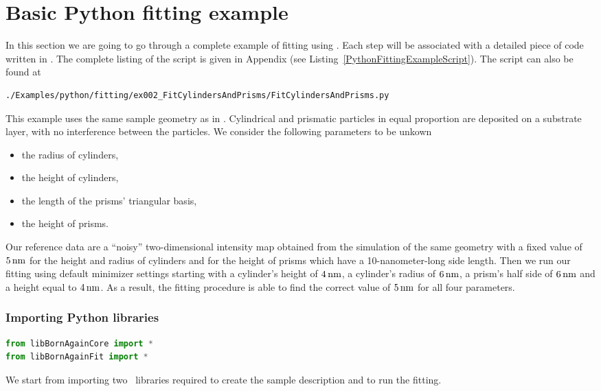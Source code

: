 \section{Basic Python fitting example} 

In this section we are going to go through a complete example of
fitting using \BornAgain. Each  step will be associated with a
detailed piece of code written in \Python. 
The complete listing of
the script is given in Appendix (see Listing~\ref{PythonFittingExampleScript}).
The script can also be found at
\begin{lstlisting}[language=shell, style=commandline]
./Examples/python/fitting/ex002_FitCylindersAndPrisms/FitCylindersAndPrisms.py
\end{lstlisting}

\noindent
This example uses the same sample geometry as in .
Cylindrical and
prismatic particles in equal proportion are deposited on a substrate layer, with no interference
between the particles. We consider the following parameters to be unkown
\begin{itemize}
\item the radius of cylinders,
\item the height of cylinders,
\item the length of the prisms' triangular basis,
\item the height of prisms.
\end{itemize}

Our reference data are a ``noisy'' two-dimensional intensity
map obtained from the simulation of the same geometry with a fixed
value of $5\,{\rm nm}$ for the height and radius of cylinders and for the
height of prisms which have a 10-nanometer-long side length. 
Then we run our fitting using default minimizer settings
starting with a cylinder's height
of $4\,{\rm nm}$, a cylinder's radius of $6\,{\rm nm}$, 
a prism's half side of $6\,{\rm nm}$ and a height equal to $4\,{\rm nm}$.
As a result, the fitting procedure is able to find the correct value of $5\,{\rm nm}$
for all four parameters.


\subsubsection*{Importing Python libraries}
\begin{lstlisting}[language=python, style=eclipseboxed]
from libBornAgainCore import *
from libBornAgainFit import *
\end{lstlisting}
We start from importing two \BornAgain\ libraries required to create
the sample description
and to run the fitting.



